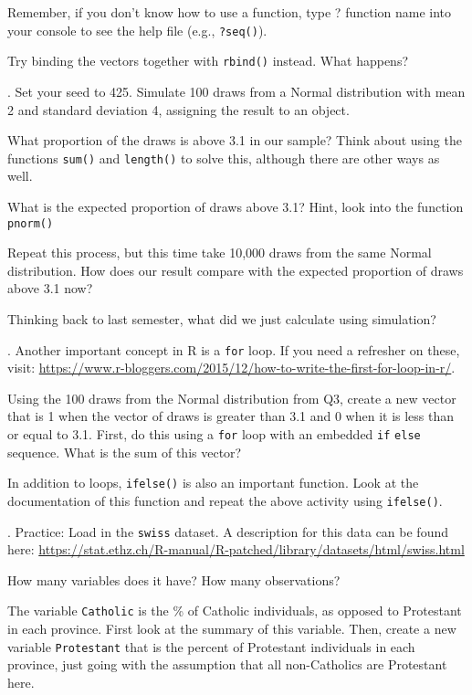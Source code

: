 \documentclass[
]{article}
\begin{document}
Remember, if you don't know how to use a function, type ? function name
into your console to see the help file (e.g., \texttt{?seq()}).

Try binding the vectors together with \texttt{rbind()} instead. What
happens?

. Set your seed to 425. Simulate 100 draws from a Normal distribution
with mean 2 and standard deviation 4, assigning the result to an object.

What proportion of the draws is above 3.1 in our sample? Think about
using the functions \texttt{sum()} and \texttt{length()} to solve this,
although there are other ways as well.

What is the expected proportion of draws above 3.1? Hint, look into the
function \texttt{pnorm()}

Repeat this process, but this time take 10,000 draws from the same
Normal distribution. How does our result compare with the expected
proportion of draws above 3.1 now?

Thinking back to last semester, what did we just calculate using
simulation?

. Another important concept in R is a \texttt{for} loop. If you need a
refresher on these, visit:
\url{https://www.r-bloggers.com/2015/12/how-to-write-the-first-for-loop-in-r/}.

Using the 100 draws from the Normal distribution from Q3, create a new
vector that is 1 when the vector of draws is greater than 3.1 and 0 when
it is less than or equal to 3.1. First, do this using a \texttt{for}
loop with an embedded \texttt{if} \texttt{else} sequence. What is the
sum of this vector?

In addition to loops, \texttt{ifelse()} is also an important function.
Look at the documentation of this function and repeat the above activity
using \texttt{ifelse()}.

. Practice: Load in the \texttt{swiss} dataset. A description for this
data can be found here:
\url{https://stat.ethz.ch/R-manual/R-patched/library/datasets/html/swiss.html}

How many variables does it have? How many observations?

The variable \texttt{Catholic} is the \% of Catholic individuals, as
opposed to Protestant in each province. First look at the summary of
this variable. Then, create a new variable \texttt{Protestant} that is
the percent of Protestant individuals in each province, just going with
the assumption that all non-Catholics are Protestant here.
\end{document}
